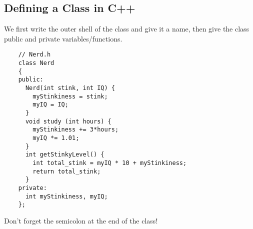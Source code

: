 \documentclass[class=article, crop=false]{standalone}
\begin{document}
  \subsection{Defining a Class in C++}
  We first write the outer shell of the class and give it a name, then give the class public and private variables/functions.
  \begin{lstlisting}
    // Nerd.h
    class Nerd
    {
    public:
      Nerd(int stink, int IQ) {
        myStinkiness = stink;
        myIQ = IQ;
      }
      void study (int hours) {
        myStinkiness += 3*hours;
        myIQ *= 1.01;
      }
      int getStinkyLevel() {
        int total_stink = myIQ * 10 + myStinkiness;
        return total_stink;
      }
    private:
      int myStinkiness, myIQ;
    };
  \end{lstlisting}
  \begin{note}{}
    Don't forget the semicolon at the end of the class!
  \end{note}
\end{document}
